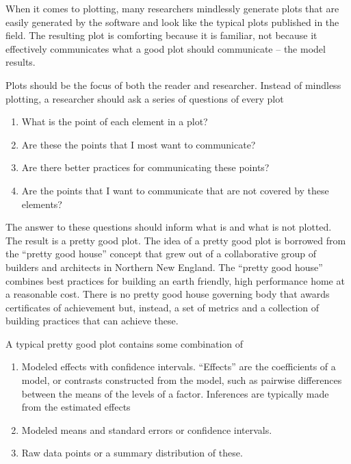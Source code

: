 \documentclass[]{book}
\providecommand{\tightlist}{%
  \setlength{\itemsep}{0pt}\setlength{\parskip}{0pt}}
\begin{document}
When it comes to plotting, many researchers mindlessly generate plots that are easily generated by the software and look like the typical plots published in the field. The resulting plot is comforting because it is familiar, not because it effectively communicates what a good plot should communicate -- the model results.

Plots should be the focus of both the reader and researcher. Instead of mindless plotting, a researcher should ask a series of questions of every plot

\begin{enumerate}
\def\labelenumi{\arabic{enumi}.}
\tightlist
\item
  What is the point of each element in a plot?
\item
  Are these the points that I most want to communicate?
\item
  Are there better practices for communicating these points?
\item
  Are the points that I want to communicate that are not covered by these elements?
\end{enumerate}

The answer to these questions should inform what is and what is not plotted. The result is a pretty good plot. The idea of a pretty good plot is borrowed from the ``pretty good house'' concept that grew out of a collaborative group of builders and architects in Northern New England. The ``pretty good house'' combines best practices for building an earth friendly, high performance home at a reasonable cost. There is no pretty good house governing body that awards certificates of achievement but, instead, a set of metrics and a collection of building practices that can achieve these.

A typical pretty good plot contains some combination of

\begin{enumerate}
\def\labelenumi{\arabic{enumi}.}
\tightlist
\item
  Modeled effects with confidence intervals. ``Effects'' are the coefficients of a model, or contrasts constructed from the model, such as pairwise differences between the means of the levels of a factor. Inferences are typically made from the estimated effects
\item
  Modeled means and standard errors or confidence intervals.
\item
  Raw data points or a summary distribution of these.
\end{enumerate}
\end{document}

